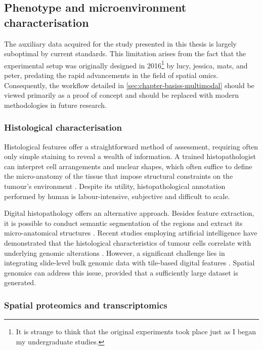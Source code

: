 \subsection{Phenotype and microenvironment characterisation}

The auxiliary data acquired for the study presented in this thesis is largely suboptimal by current standards. This limitation arises from the fact that the experimental setup was originally designed in 2016\footnote{It is strange to think that the original experiments took place just as I began my undergraduate studies.} by \ac{lucy}, \ac{jessica}, \ac{mats}, and \ac{peter}, predating the rapid advancements in the field of spatial omics. Consequently, the workflow detailed in \cref{sec:chapter-basiss-multimodal} should be viewed primarily as a proof of concept and should be replaced with modern methodologies in future research.

\subsubsection*{Histological characterisation}

Histological features offer a straightforward method of assessment, requiring often only simple staining to reveal a wealth of information. A trained histopathologist can interpret cell arrangements and nuclear shapes, which often suffice to define the micro-anatomy of the tissue that impose structural constraints on the tumour's environment . Despite its utility, histopathological annotation performed by human is labour-intensive, subjective and difficult to scale.

Digital histopathology offers an alternative approach. Besides feature extraction, it is possible to conduct semantic segmentation of the regions and extract its micro-anatomical structures \parencite{Kiemen2020-dc}. Recent studies employing artificial intelligence have demonstrated that the histological characteristics of tumour cells correlate with underlying genomic alterations \parencite{Fu2020-cp, Kather2020-bt}. However, a significant challenge lies in integrating slide-level bulk genomic data with tile-based digital features \parencite{Shmatko2022-to}. Spatial genomics can address this issue, provided that a sufficiently large dataset is generated.

\subsubsection*{Spatial proteomics and transcriptomics}

